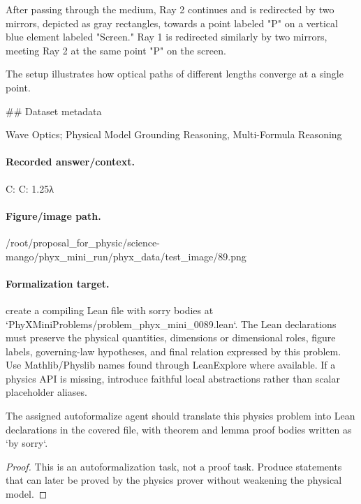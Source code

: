 After passing through the medium, Ray 2 continues and is redirected by two mirrors, depicted as gray rectangles, towards a point labeled "P" on a vertical blue element labeled "Screen." Ray 1 is redirected similarly by two mirrors, meeting Ray 2 at the same point "P" on the screen.

The setup illustrates how optical paths of different lengths converge at a single point.

\#\# Dataset metadata

Wave Optics; Physical Model Grounding Reasoning, Multi-Formula Reasoning

\paragraph{Recorded answer/context.}
C: C: 1.25λ

\paragraph{Figure/image path.}
/root/proposal\_for\_physic/science-mango/phyx\_mini\_run/phyx\_data/test\_image/89.png

\paragraph{Formalization target.}
create a compiling Lean file with sorry bodies at `PhyXMiniProblems/problem\_phyx\_mini\_0089.lean`. The Lean declarations must preserve the physical quantities, dimensions or dimensional roles, figure labels, governing-law hypotheses, and final relation expressed by this problem.
Use Mathlib/Physlib names found through LeanExplore where available. If a physics API is missing, introduce faithful local abstractions rather than scalar placeholder aliases.

\begin{theorem}
\label{thm:physics:phyx_mini_0089:target}
The assigned autoformalize agent should translate this physics problem into Lean declarations in the covered file, with theorem and lemma proof bodies written as `by sorry`.
\end{theorem}
\begin{proof}
This is an autoformalization task, not a proof task. Produce statements that can later be proved by the physics prover without weakening the physical model.
\end{proof}

